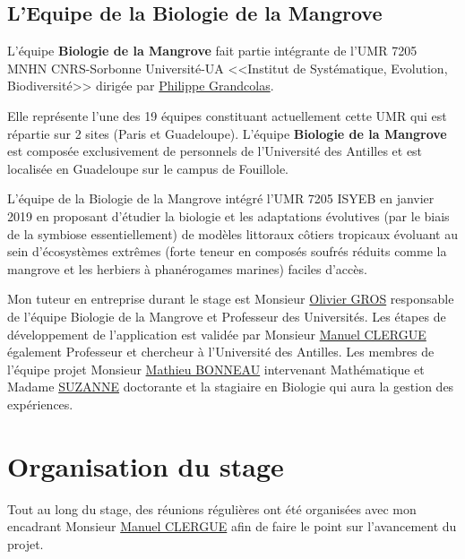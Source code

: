 
        \subsection{L'Equipe de la Biologie de la Mangrove}
        L'équipe \textbf{Biologie de la Mangrove} fait partie intégrante de l'UMR 7205 MNHN CNRS-Sorbonne Université-UA <<Institut de Systématique, Evolution, Biodiversité>> dirigée par \underline{Philippe Grandcolas}.

        \vspace{0.2cm}

        
        Elle représente l'une des 19 équipes constituant actuellement cette UMR qui est répartie sur 2 sites (Paris et Guadeloupe). L'équipe \textbf{Biologie de la Mangrove} est composée exclusivement de personnels de l'Université des Antilles et est localisée en Guadeloupe sur le campus de Fouillole.

        \vspace{0.2cm}
        
        L'équipe de la Biologie de la Mangrove intégré l'UMR 7205 ISYEB en janvier 2019 en proposant d'étudier la biologie et les adaptations évolutives (par le biais de la symbiose essentiellement) de modèles littoraux côtiers tropicaux évoluant au sein d'écosystèmes extrêmes (forte teneur en composés soufrés réduits comme la mangrove et les herbiers à phanérogames marines) faciles d'accès.
    
        \vspace{0.2cm}
    
        Mon tuteur en entreprise durant le stage est Monsieur \underline{Olivier GROS} responsable de l'équipe Biologie de la Mangrove et Professeur des Universités.
        Les étapes de développement de l'application est validée par Monsieur \underline{Manuel CLERGUE} également Professeur et chercheur à l'Université des Antilles.
        Les membres de l'équipe projet Monsieur \underline{Mathieu BONNEAU} intervenant Mathématique et Madame \underline{SUZANNE} doctorante et la stagiaire en Biologie qui aura la gestion des expériences.

    

    \section{Organisation du stage} 
    Tout au long du stage, des réunions régulières ont été organisées avec mon encadrant Monsieur \underline{Manuel CLERGUE} afin de faire le point sur l'avancement du projet.

